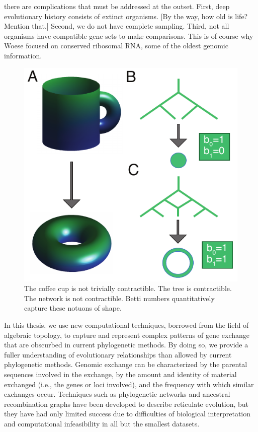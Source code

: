 there are complications that must be addressed at the outset.
First, deep evolutionary history consists of extinct organisms.
[By the way, how old is life? Mention that.]
Second, we do not have complete sampling.
Third, not all organisms have compatible gene sets to make comparisons.
This is of course why Woese focused on conserved ribosomal RNA, some of the oldest genomic information.

\begin{figure}
\includegraphics[width=\columnwidth]{./fig/introduction/topology_example.pdf}
\caption[The Paradigmatic Topology Example]{The coffee cup is not trivially contractible. The tree is contractible. The network is not contractible. Betti numbers quantitatively capture these notuons of shape.}
\label{fig:topology_example}
\end{figure}

In this thesis, we use new computational techniques, borrowed from the field of algebraic topology, to capture and represent complex patterns of gene exchange that are obscurbed in current phylogenetic methods.
By doing so, we provide a fuller understanding of evolutionary relationships than allowed by current phylogenetic methods.
Genomic exchange can be characterized by the parental sequences involved in the exchange, by the amount and identity of material exchanged (i.e., the genes or loci involved), and the frequency with which similar exchanges occur.
Techniques such as phylogenetic networks and ancestral recombination graphs have been developed to describe reticulate evolution, but they have had only limited success due to difficulties of biological interpretation and computational infeasibility in all but the smallest datasets.

